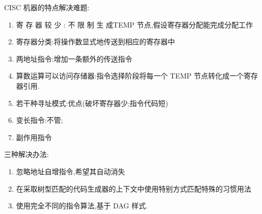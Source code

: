 CISC 机器的特点解决难题:
\begin{enumerate}
    \item  寄 存 器 较 少 : 不 限 制 生 成TEMP 节点,假设寄存器分配能完成分配工作
    \item 寄存器分类:将操作数显式地传送到相应的寄存器中
    \item 两地址指令:增加一条额外的传送指令
    \item 算数运算可以访问存储器:指令选择阶段将每一个 TEMP 节点转化成一个寄存器引用.
    \item 若干种寻址模式:优点(破坏寄存器少;指令代码短)
    \item 变长指令:不管;
    \item 副作用指令
\end{enumerate}

三种解决办法:
\begin{enumerate}
    \item 忽略地址自增指令,希望其自动消失
    \item 在采取树型匹配的代码生成器的上下文中使用特别方式匹配特殊的习惯用法
    \item 使用完全不同的指令算法,基于 DAG 样式.
\end{enumerate}